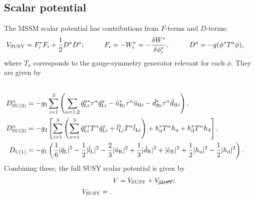 \documentclass[CheatSheet]{subfiles}
\begin{document}
\subsection{Scalar potential}
The MSSM scalar potential has contributions from $F$-terms and $D$-terms:
\begin{alignat}{3}
 V_{\mathrm{SUSY}} &= F^{*}_i F_i+\frac12 D^aD^a;
\qquad&
 F_i &= -W_i^* = -\frac{\delta W^*}{\delta \phi_i^*},
\qquad&
 D^a &= -g(\phi^* T^a \phi),
\end{alignat}
where $T_a$ corresponds to the gauge-symmetry generator relevant for each $\phi$.
They are given by
\begin{align}

\\
D\w{SU(3)}^\alpha &= -g_3\sum_{i=1}^3\left(
 \sum_{a=1,2}
  \tqL[i]^{a*} \tau^\alpha \tqL[i]^{a}
- \tuR[i]^{*} \tau^\alpha \tuR[i]
- \tdR[i]^{*} \tau^\alpha \tdR[i]
\right),\\
%
D\w{SU(2)}^\alpha &= -g_2\left[
   \sum_{i=1}^3\left(
  \sum_{x=1}^3 \tqL[i]^{x*}T^\alpha\tqL[i]^{x}
+              \tlL[i]^{*}T^\alpha \tlL[i]
  \right)
+ \hu^*T^\alpha\hu
+ \hd^*T^\alpha\hd
\right],\\
%
 D\w{U(1)} &= -g_1\left(
  \frac16|\tqL|^2
- \frac12|\tlL|^2
- \frac23|\tuR|^2
+ \frac13|\tdR|^2
+        |\teR|^2
+ \frac12|\hu|^2
- \frac12|\hd|^2
\right).
\end{align}
Combining these, the full SUSY scalar potential is given by
\begin{align}
  V &= V_{\mathrm{SUSY}} + V_{\cancel{\mathrm{SUSY}}};\\
  \begin{split}
   V_{\mathrm{SUSY}} &= .
  \end{split}
\end{align}
\end{document}
